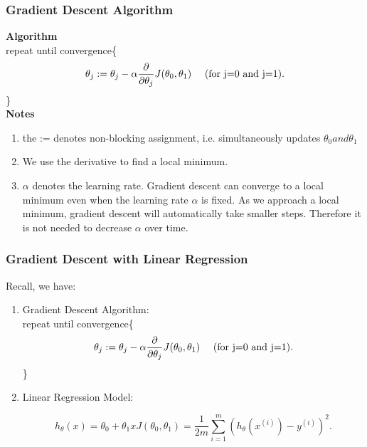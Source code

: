 \documentclass[letter]{article}
\begin{document}
        \subsubsection{Gradient Descent Algorithm}
            \textbf{Algorithm} \\
                repeat until convergence\{  
                    \[ \theta_j := \theta_j - \alpha \frac{\partial }{\partial \theta_j} J(\theta_0, \theta_1)\mbox{\hspace{10pt} (for j=0 and j=1)} 
                   .\] \}
        \\


           \textbf{Notes}
               \begin{enumerate}
                   \item the := denotes non-blocking assignment, i.e. simultaneously updates $\theta_0 and \theta_1$ 
                   \item We use the derivative to find a local minimum. 
                   \item $\alpha$ denotes the learning rate. Gradient descent can converge to a local minimum even when the learning rate $\alpha$ is fixed. As we approach a local minimum, gradient descent will automatically take smaller steps. Therefore it is not needed to decrease $\alpha$ over time. 
               \end{enumerate}

       \subsubsection{Gradient Descent with Linear Regression}
     
       Recall, we have:
       \begin{enumerate}
           \item Gradient Descent Algorithm: \\ 
               \linebreak
               repeat until convergence\{  
                    \[ \theta_j := \theta_j - \alpha \frac{\partial }{\partial \theta_j} J(\theta_0, \theta_1)\mbox{\hspace{10pt} (for j=0 and j=1)} 
                   .\] \}


           \item Linear Regression Model:
               \begin{center}
               \[
               h_\theta (x) = \theta_0 + \theta_1x

               J(\theta_0, \theta_1) = \frac{1}{2m} \sum_{i=1}^{m} (h_\theta(x^{(i)}) - y^{(i)} )^2

               .\]             

               \end{center}

       \end{enumerate}
            
\end{document}
